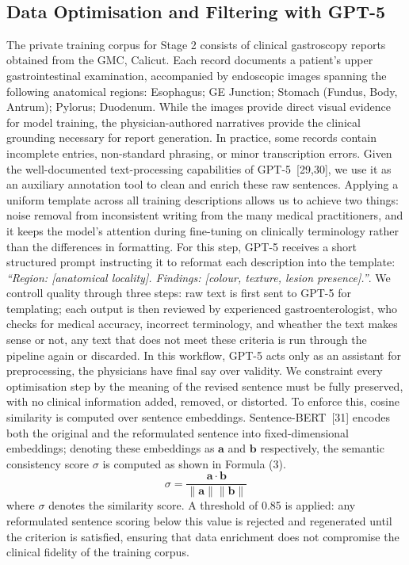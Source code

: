﻿﻿\documentclass[12pt]{report}
\begin{document}
\subsection{Data Optimisation and Filtering with GPT-5}
The private training corpus for Stage 2 consists of clinical gastroscopy reports obtained from the GMC, Calicut. Each record documents a patient's upper gastrointestinal examination, accompanied by endoscopic images spanning the following anatomical regions: Esophagus; GE Junction; Stomach (Fundus, Body, Antrum); Pylorus; Duodenum. While the images provide direct visual evidence for model training, the physician-authored narratives provide the clinical grounding necessary for report generation. In practice, some records contain incomplete entries, non-standard phrasing, or minor transcription errors. Given the well-documented text-processing capabilities of GPT-5~[29,30], we use it as an auxiliary annotation tool to clean and enrich these raw sentences.
Applying a uniform template across all training descriptions allows us to achieve two things: noise removal from inconsistent writing from the many medical practitioners, and it keeps the model's attention during fine-tuning on clinically terminology rather than the differences in formatting. For this step, GPT-5 receives a short structured prompt instructing it to reformat each description into the template: \textit{``Region: [anatomical locality]. Findings: [colour, texture, lesion presence].''}. We controll quality through three steps: raw text is first sent to GPT-5 for templating; each output is then reviewed by experienced gastroenterologist, who checks for medical accuracy, incorrect terminology, and wheather the text makes sense or not, any text that does not meet these criteria is run through the pipeline again or discarded. In this workflow, GPT-5 acts only as an assistant for preprocessing, the physicians have final say over validity.
We constraint every optimisation step by the meaning of the revised sentence must be fully preserved, with no clinical information added, removed, or distorted. To enforce this, cosine similarity is computed over sentence embeddings. Sentence-BERT~[31] encodes both the original and the reformulated sentence into fixed-dimensional embeddings; denoting these embeddings as $\mathbf{a}$ and $\mathbf{b}$ respectively, the semantic consistency score $\sigma$ is computed as shown in Formula (3).
\begin{equation}
\sigma = \frac{\mathbf{a} \cdot \mathbf{b}}{\|\mathbf{a}\| \|\mathbf{b}\|}
\label{eq:cosine}
\end{equation}
where $\sigma$ denotes the similarity score. A threshold of 0.85 is applied: any reformulated sentence scoring below this value is rejected and regenerated until the criterion is satisfied, ensuring that data enrichment does not compromise the clinical fidelity of the training corpus.
\end{document}
